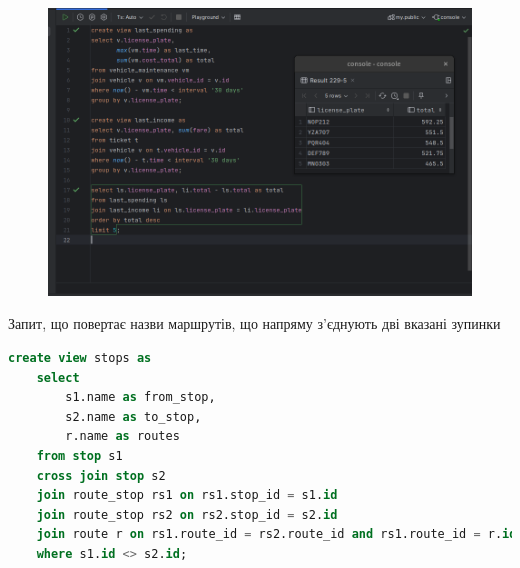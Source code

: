\documentclass[14pt]{extreport}
\begin{document}
\begin{normalsize}

	\begin{figure}[H]
		\centering
		\includegraphics[scale=0.5]{2}
		\caption{}
	\end{figure}
	
	Запит, що повертає назви маршрутів, що напряму з'єднують дві вказані зупинки
	
	\iffalse
	\begin{lstlisting}[language=sql]
	create view stops as
	select
		s1.name as from_stop,
		s2.name as to_stop,
		r.name as routes
	from stop s1
	cross join stop s2
	join route_stop rs1 on rs1.stop_id = s1.id
	join route_stop rs2 on rs2.stop_id = s2.id
	join route r on rs1.route_id = rs2.route_id and rs1.route_id = r.id
	where s1.id <> s2.id;
	

\end{lstlisting}
\end{normalsize}
\end{document}
